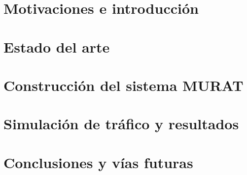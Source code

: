 \part{Motivaciones e introducción}
    \label{part:one}


\part{Estado del arte}
    \label{part:two}


\part{Construcción del sistema MURAT}
    \label{part:three}




\part{Simulación de tráfico y resultados}
    \label{part:four}


\part{Conclusiones y vías futuras}
    \label{part:five}

